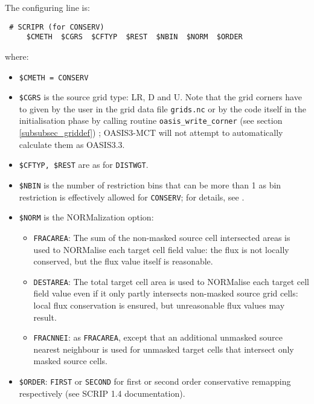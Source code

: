 \begin{itemize}
\begin{itemize}
    The configuring line is:
  \begin{verbatim}
 # SCRIPR (for CONSERV)
     $CMETH  $CGRS  $CFTYP  $REST  $NBIN  $NORM  $ORDER 
\end{verbatim}
    \vspace{-0.5cm} where:
    \begin{itemize}
    \item {\tt \$CMETH = CONSERV}
    \item {\tt \$CGRS} is the source grid type: LR, D and U. Note that
      the grid corners have to given by the user in the grid data file
      {\tt grids.nc} or by the code itself in the initialisation phase
      by calling routine {\tt oasis\_write\_corner} (see section
      \ref{subsubsec_griddef}) ; OASIS3-MCT will not attempt to
      automatically calculate them as OASIS3.3.
    \item {\tt \$CFTYP, \$REST} are as for {\tt DISTWGT}.
    \item {\tt \$NBIN} is the number of restriction bins that can be more than 1 as bin restriction is effectively allowed for {\tt CONSERV}; for details, see \citep{piacentini08}.
    \item {\tt \$NORM} is the NORMalization option:
      \begin{itemize}
      \item {\tt FRACAREA}: The sum of the non-masked source cell
        intersected areas is used to NORMalise each target cell field
        value: the flux is not locally conserved, but the flux value
        itself is reasonable.
      \item {\tt DESTAREA}: The total target cell area is used to
        NORMalise each target cell field value even if it only partly
        intersects non-masked source grid cells: local flux
        conservation is ensured, but unreasonable flux values may
        result.
      \item {\tt FRACNNEI}: as {\tt FRACAREA}, except that an additional unmasked  source nearest neighbour is used for unmasked
        target cells that intersect only masked source cells.  
      \end{itemize}
    \item {\tt \$ORDER}: {\tt FIRST} or {\tt SECOND} for first or
      second order conservative remapping respectively (see SCRIP 1.4
      documentation).


\end{itemize}
\end{itemize}
\end{itemize}
